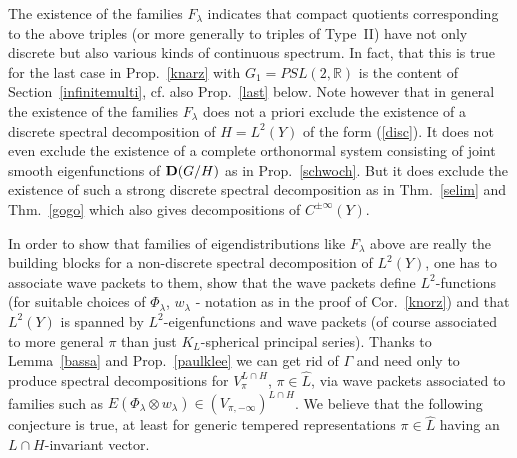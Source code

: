 \documentclass[10]{amsart}
\theoremstyle{remark}
\theoremstyle{definition}
\numberwithin{equation}{section}
\newcommand{\R}{\mathbb{R}}           %
\begin{document}
{The existence of the families $F_\lambda$ indicates that compact quotients corresponding to the above triples (or more generally to triples of Type~II) have not only discrete but also
various kinds of continuous spectrum. In fact, that this is true for the last case in Prop.~\ref{knarz}  with $G_1=PSL(2,\R)$ is the content of Section~\ref{infinitemulti}, cf. also Prop.~\ref{last} below. Note however 
that in general the existence of the families $F_\lambda$ does not a priori exclude the existence of a discrete spectral decomposition of $H=L^2(Y)$ of the form (\ref{disc}). It does not even exclude the existence of a complete orthonormal
system consisting of joint smooth eigenfunctions of ${\bf D}(G/H)$ as in Prop.~\ref{schwoch}. But it does exclude the existence of such a strong discrete spectral decomposition as in 
Thm.~\ref{selim}
and Thm.~\ref{gogo} which also gives decompositions of  $C^{\pm\infty}(Y)$.

In order to show that families of eigendistributions like $F_\lambda$ above are really the building blocks for a non-discrete spectral decomposition of $L^2(Y)$, one has to associate wave packets to them, show that the wave packets define $L^2$-functions (for suitable choices of $\Phi_\lambda$, $w_\lambda$ - notation as in the proof of Cor.~\ref{knorz}) and that $L^2(Y)$ is spanned by $L^2$-eigenfunctions and wave packets (of course associated to more general $\pi$ than just $K_L$-spherical principal series). Thanks to Lemma~\ref{bassa} and Prop.~\ref{paulklee} we can get rid of $\Gamma$ and need only to produce spectral decompositions for $V_\pi^{L\cap H}$, $\pi\in\widehat L$, via wave packets associated to families such as $E(\Phi_\lambda\otimes w_\lambda)\in (V_{\pi,-\infty})^{L\cap H}$.
We believe that the following conjecture is true, at least for generic tempered representations $\pi\in\widehat L$ having an $L\cap H$-invariant vector.

}
\end{document}
